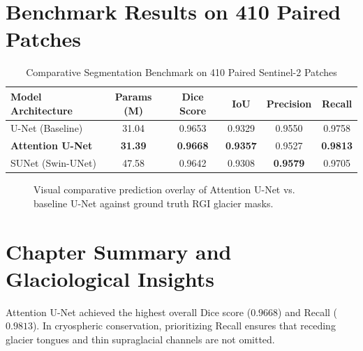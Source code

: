 \documentclass[12pt,a4paper]{report}
\begin{document}
\section{Benchmark Results on 410 Paired Patches}
\begin{table}[H]
\centering
\caption{Comparative Segmentation Benchmark on 410 Paired Sentinel-2 Patches}
\label{tab:glacier_segmentation_benchmark}
\begin{tabular}{lccccc}
\toprule
\textbf{Model Architecture} & \textbf{Params (M)} & \textbf{Dice Score} & \textbf{IoU} & \textbf{Precision} & \textbf{Recall} \\
\midrule
U-Net (Baseline) & 31.04 & 0.9653 & 0.9329 & 0.9550 & 0.9758 \\
\textbf{Attention U-Net} & \textbf{31.39} & \textbf{0.9668} & \textbf{0.9357} & 0.9527 & \textbf{0.9813} \\
SUNet (Swin-UNet) & 47.58 & 0.9642 & 0.9308 & \textbf{0.9579} & 0.9705 \\
\bottomrule
\end{tabular}
\end{table}

\begin{figure}[H]
\centering
\caption{Visual comparative prediction overlay of Attention U-Net vs. baseline U-Net against ground truth RGI glacier masks.}
\label{fig:glacier_predictions_overlay}
\end{figure}

\section{Chapter Summary and Glaciological Insights}
Attention U-Net achieved the highest overall Dice score ($0.9668$) and Recall ($0.9813$). In cryospheric conservation, prioritizing Recall ensures that receding glacier tongues and thin supraglacial channels are not omitted.


\end{document}
